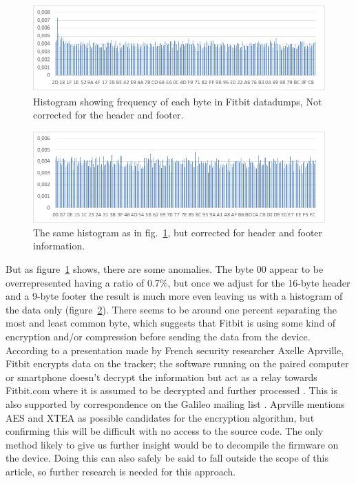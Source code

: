 \documentclass[a4paper,11pt,dvips]{article}
\begin{document}
\begin{figure}
\noindent
\includegraphics[natwidth=624bp,natheight=184bp,width=\linewidth]{histogram_meta}
\caption{Histogram showing frequency of each byte in Fitbit datadumps, Not corrected for the header and footer.}
\label{fig:histogram_meta}
\end{figure}

\begin{figure}
\noindent
\includegraphics[natwidth=624bp,natheight=195bp,width=\linewidth]{histogram_nometa}
\caption{The same histogram as in fig.~\ref{fig:histogram_meta}, but corrected for header and footer information.}
\label{fig:histogram_nometa}
\end{figure}

But as figure~\ref{fig:histogram_meta} shows, there are some anomalies. The byte 00 appear to be overrepresented having a ratio of 0.7\%, but once we adjust for the 16-byte header and a 9-byte footer the result is much more even leaving us with a histogram of the data only (figure~\ref{fig:histogram_nometa}). There seems to be around one percent separating the most and least common byte, which suggests that Fitbit is using some kind of encryption and/or compression before sending the data from the device. According to a presentation made by French security researcher Axelle Aprville, Fitbit encrypts data on the tracker; the software running on the paired computer or smartphone doesn't decrypt the information but act as a relay towards Fitbit.com where it is assumed to be decrypted and further processed \citep{Aprville:2015a}. This is also supported by correspondence on the Galileo mailing list \citep{Allard:2014b}. Aprville mentions AES and XTEA as possible candidates for the encryption algorithm, but confirming this will be difficult with no access to the source code. The only method likely to give us further insight would be to decompile the firmware on the device. Doing this can also safely be said to fall outside the scope of this article, so further research is needed for this approach.
\end{document}

